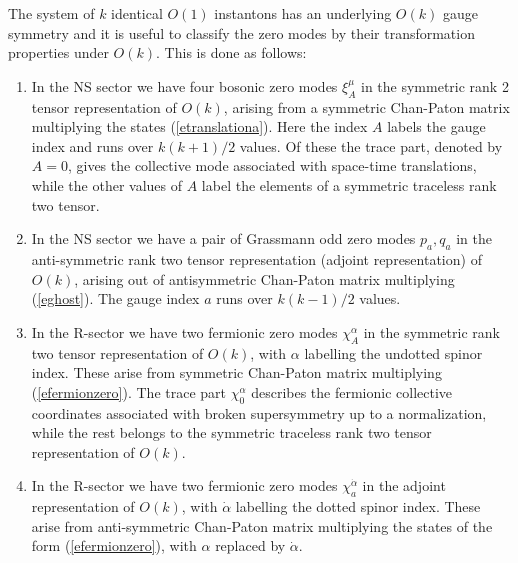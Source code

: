 \documentclass[12pt,a4paper]{article}
\newcommand{\refb}[1]{(\ref{#1})}
\newcommand{\dalpha}{\beta}
\def\dalpha{{\dot\alpha}}
\begin{document}
The system of $k$ identical $O(1)$ instantons has an underlying $O(k)$
gauge symmetry and it is useful to classify the zero modes by their transformation properties
under $O(k)$.
This is done as follows:
\begin{enumerate}
\item
In the NS sector we have four bosonic zero modes $\xi^\mu_A$ in the symmetric rank 2 tensor
representation of $O(k)$, arising from a symmetric Chan-Paton matrix multiplying the
states \refb{etranslationa}. Here the index $A$ labels the gauge index and runs over
$k(k+1)/2$ values. Of these the trace part, denoted by $A=0$, gives the collective mode
associated with space-time translations, while the other values of $A$ label the elements of
a symmetric traceless rank two tensor.

\item
In the NS sector we have a pair of Grassmann odd zero modes $p_a,q_a$
in the anti-symmetric rank two tensor
representation (adjoint representation) of $O(k)$, arising out of antisymmetric Chan-Paton
matrix multiplying \refb{eghost}. The gauge index $a$ runs over $k(k-1)/2$ values.

\item
In the R-sector we have two fermionic zero modes  $\chi_A^\alpha$ in the symmetric rank two tensor
representation of $O(k)$, with $\alpha$ labelling the undotted spinor index. These arise from
symmetric Chan-Paton matrix multiplying \refb{efermionzero}.
The trace part $\chi_0^\alpha$ describes the fermionic collective coordinates associated with broken
supersymmetry up to a normalization, while the rest belongs to the symmetric traceless
rank two tensor representation of $O(k)$.

\item
In the R-sector we have two fermionic zero modes  $\chi_a^\dalpha$ in the
adjoint representation of $O(k)$, with $\dalpha$ labelling the dotted spinor index.
These arise from anti-symmetric Chan-Paton matrix multiplying the states of the
form \refb{efermionzero}, with $\alpha$ replaced by $\dalpha$.
\end{enumerate}
\end{document}
